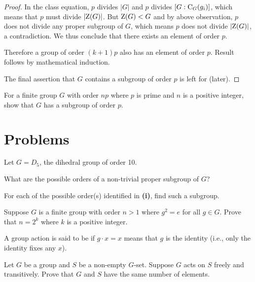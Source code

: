 \begin{proof}
    In the class equation, $p$ divides $|G|$ and $p$ divides $[G:\mathrm{C}_{G}(g_i)]$, which means that $p$ must divide $|\mathrm{Z}(G)|$. But $\mathrm{Z}(G) < G$ and by above observation, $p$ does not divide any proper subgroup of $G$, which means $p$ does not divide $|\mathrm{Z}(G)|$, a contradiction. We thus conclude that there exists an element of order $p$.

    Therefore a group of order $(k+1)p$ also has an element of order $p$. Result follows by mathematical induction.

    The final assertion that $G$ contains a subgroup of order $p$ is left for  (later).
\end{proof}

\begin{exercise}\label{exercise-group-of-order-multiple-of-prime-has-subgroup-of-prime-order}
    For a finite group $G$ with order $np$ where $p$ is prime and $n$ is a positive integer, show that $G$ has a subgroup of order $p$.
\end{exercise}

\newpage

\section{Problems}
\begin{problem}
    Let $G = D_5$, the dihedral group of order 10.
    \begin{partquestions}{\roman*}
        \item What are the possible orders of a non-trivial proper subgroup of $G$?
        \item For each of the possible order(s) identified in \textbf{(i)}, find such a subgroup.
    \end{partquestions}
\end{problem}

\begin{problem}
    Suppose $G$ is a finite group with order $n > 1$ where $g^2 = e$ for all $g \in G$. Prove that $n = 2^k$ where $k$ is a positive integer.
\end{problem}

\begin{problem}
    A group action is said to be  if $g\cdot x = x$ means that $g$ is the identity (i.e., only the identity fixes any $x$).

    Let $G$ be a group and $S$ be a non-empty $G$-set. Suppose $G$ acts on $S$ freely and transitively. Prove that $G$ and $S$ have the same number of elements.
\end{problem}

